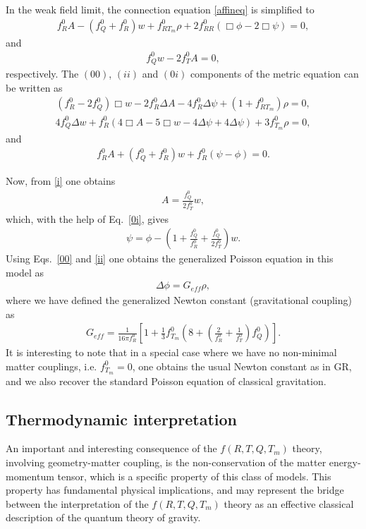 \documentclass[aps,superscriptaddress, showpacs,preprintnumbers, superscriptaddress, nofootinbibt,twocolumn]{revtex4}
\newcommand{\f}[2]{\frac{#1}{#2}}
\begin{document}
In the weak field limit, the connection equation \eqref{affineq} is simplified to
\begin{align}\label{0}
f^0_R A-(f^0_Q+f^0_R)w+f^0_{RT_m}\rho+2f^0_{RR}(\Box\phi-2\Box\psi)=0,
\end{align}
and
\begin{align}\label{i}
f^0_Qw-2f^0_TA=0,
\end{align}
respectively. The $(00)$, $(ii)$ and $(0i)$ components of the metric equation can be written as
\begin{align}\label{00}
(f^0_R-2f^0_Q)\Box w-2f^0_R\Delta A-4f^0_R\Delta \psi+(1+f^0_{RT_m})\rho=0,
\end{align}
\begin{align}\label{ii}
4f^0_Q\Delta w+f^0_R(4\Box A-5\Box w-4\Delta\psi+4\Delta\psi)+3f^0_{T_m}\rho=0,
\end{align}
and
\begin{align}\label{0i}
f^0_R A+(f^0_Q+f^0_R)w+f^0_R(\psi-\phi)=0.
\end{align}

Now, from \eqref{i} one obtains
\begin{align}
	A=\f{f^0_Q}{2f^0_T}w,
\end{align}
which, with the help of Eq.~\eqref{0i}, gives
\begin{align}
\psi=\phi-\left(1+\f{f^0_Q}{f^0_R}+\f{f^0_Q}{2f^0_T}\right)w.
\end{align}
Using Eqs.~\eqref{00} and \eqref{ii} one obtains the generalized Poisson equation in this model as
\begin{align}
\Delta\phi=G_{eff}\rho,
\end{align}
where we have defined the generalized Newton constant (gravitational coupling) as
\begin{align}
G_{eff}=\f{1}{16\pi f^0_R}\left[1+\f13f^0_{T_m}\left(8+\left(\f{2}{f^0_R}+\f{1}{f^0_T}\right)f^0_Q\right)\right].
\end{align}
It is interesting to note that in a special case where we have no non-minimal matter couplings, i.e. $f^0_{T_m}=0$, one obtains the usual Newton constant as in GR, and we also recover the standard Poisson equation of classical gravitation.

\subsection{Thermodynamic interpretation}

An important and interesting consequence of the $f\left(R,T,Q,T_m\right)$ theory, involving
geometry-matter coupling,  is the non-conservation of the matter
energy-momentum tensor,  which is a specific property of this class of models. This property has fundamental
 physical implications, and may represent the bridge between the
interpretation of the $f\left(R,T,Q,T_m\right)$ theory as an effective classical description
of the quantum theory of gravity.
\end{document}
